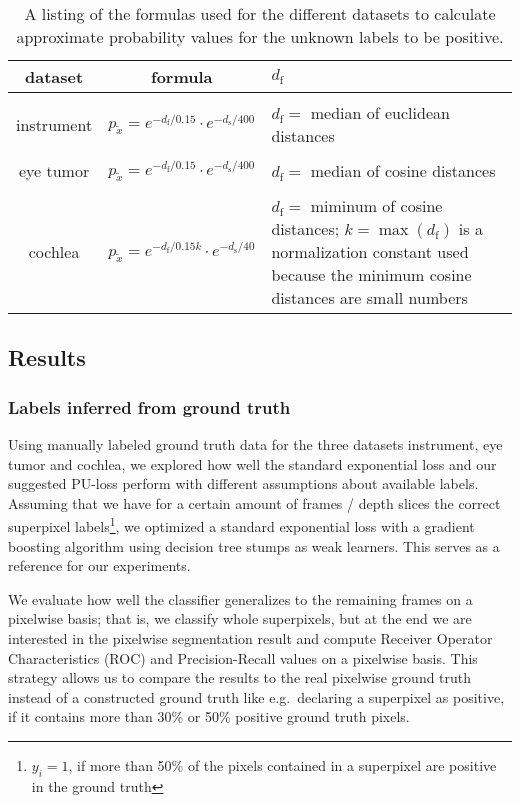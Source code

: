 \begin{table}[ht]
	\centering
	  \caption{A listing of the formulas used for the different datasets to calculate approximate probability values for the unknown labels to be positive.}
	  \label{tab:probabilities}
	\begin{tabular}{ | c  c  p{7cm} | }
	\hline
	  dataset	& formula 								& $d_{\text{f}}$  \\ \hline
			& & \\
	  instrument  	& $p_{\tilde x} = e^{-d_{\text{f}}/0.15} \cdot e^{-d_{\text{s}}/400}$ 	& $d_{\text{f}} = $ median of euclidean distances  \\ 
	  & & \\
	  eye tumor	& $p_{\tilde x} = e^{-d_{\text{f}}/0.15} \cdot e^{-d_{\text{s}}/400}$ 	& $d_{\text{f}} = $ median of cosine distances 	  \\ 
	  & & \\
	  cochlea 	& $p_{\tilde x} = e^{-d_{\text{f}}/0.15k} \cdot e^{-d_{\text{s}}/40}$ 	& $d_{\text{f}} = $ miminum of cosine distances; $k = \max(d_\text{f})$ is a normalization constant used because the minimum cosine distances are small numbers\\ \hline
	\end{tabular}
\end{table}

\subsection{Results}
\subsubsection*{Labels inferred from ground truth}
Using manually labeled ground truth data for the three datasets instrument, eye tumor and cochlea, we explored how well the standard exponential loss and our suggested PU-loss perform with different assumptions about available labels. 
Assuming that we have for a certain amount of frames / depth slices the correct superpixel labels\footnote{$y_i = 1$, if more than 50\% of the pixels contained in a superpixel are positive in the ground truth}, we optimized a standard exponential loss with a gradient boosting algorithm using decision tree stumps as weak learners. 
This serves as a reference for our experiments.

We evaluate how well the classifier generalizes to the remaining frames on a pixelwise basis; that is, we classify whole superpixels, but at the end we are interested in the pixelwise segmentation result and compute Receiver Operator Characteristics (ROC) and Precision-Recall values on a pixelwise basis. 
This strategy allows us to compare the results to the real pixelwise ground truth instead of a constructed ground truth like e.g.\ declaring a superpixel as positive, if it contains more than 30\% or 50\% positive ground truth pixels.

